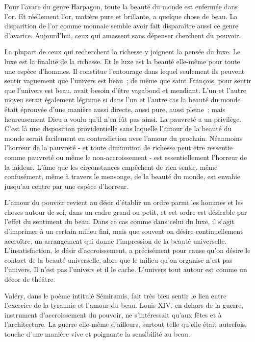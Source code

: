 \documentclass[french,twoside]{book} %
\begin{document}
Pour l'avare du genre Harpagon, toute la beauté du monde est enfermée dans l'or. Et réellement l'or, matière pure et brillante, a quelque chose de beau. La disparition de l'or comme monnaie semble avoir fait disparaître aussi ce genre d'avarice. Aujourd'hui, ceux qui amassent sans dépenser cherchent du pouvoir.\par
La plupart de ceux qui recherchent la richesse y joignent la pensée du luxe. Le luxe est la finalité de la richesse. Et le luxe est la beauté elle-même pour toute une espèce d'hommes. Il constitue l'entourage dans lequel seulement ils peuvent sentir vaguement que l'univers est beau ; de même que saint François, pour sentir que l'univers est beau, avait besoin d'être vagabond et mendiant. L'un et l'autre moyen serait également légitime si dans l'un et l'autre cas la beauté du monde était éprouvée d'une manière aussi directe, aussi pure, aussi pleine ; mais heureusement Dieu a voulu qu'il n'en fût pas ainsi. La pauvreté a un privilège. C'est là une disposition providentielle sans laquelle l'amour de la beauté du monde serait facilement en contradiction avec l'amour du prochain. Néanmoins l'horreur de la pauvreté - et toute diminution de richesse peut être ressentie comme pauvreté ou même le non-accroissement - est essentiellement l'horreur de la laideur. L'âme que les circonstances empêchent de rien sentir, même confusément, même à travers le mensonge, de la beauté du monde, est envahie jusqu'au centre par une espèce d'horreur.\par
L'amour du pouvoir revient au désir d'établir un ordre parmi les hommes et les choses autour de soi, dans un cadre grand ou petit, et cet ordre est désirable par l'effet du sentiment du beau. Dans ce cas comme dans celui du luxe, il s'agit d'imprimer à un certain milieu fini, mais que souvent on désire continuellement accroître, un arrangement qui donne l'impression de la beauté universelle. L'insatisfaction, le désir d'accroissement, a précisément pour cause qu'on désire le contact de la beauté universelle, alors que le milieu qu'on organise n'est pas l'univers. Il n'est pas l'univers et il le cache. L'univers tout autour est comme un décor de théâtre.\par
Valéry, dans le poème intitulé Sémiramis, fait très bien sentir le lien entre l'exercice de la tyrannie et l'amour du beau. Louis XIV, en dehors de la guerre, instrument d'accroissement du pouvoir, ne s'intéressait qu'aux fêtes et à l'architecture. La guerre elle-même d'ailleurs, surtout telle qu'elle était autrefois, touche d'une manière vive et poignante la sensibilité au beau.\par
\end{document}

